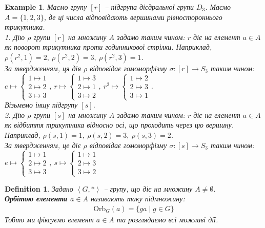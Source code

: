 \documentclass[a4paper, 10pt]{article}
\theoremstyle{theoremdd}
\theoremstyle{theoremdd}
\newtheorem{definition}[theorem]{Definition}
\theoremstyle{theoremdd}
\theoremstyle{theoremdd}
\theoremstyle{theoremdd}
\newtheorem{example}[theorem]{Example}
\theoremstyle{theoremdd}
\theoremstyle{theoremdd}
\theoremstyle{theoremdd}
\theoremstyle{theoremdd}
\theoremstyle{theoremdd}
\theoremstyle{theoremdd}
\theoremstyle{theoremdd}
\theoremstyle{theoremdd}
\theoremstyle{theoremdd}
\theoremstyle{theoremdd}
\newcommand\Orb{\text{Orb}}
\begin{document}
\begin{example}
Маємо групу $[r]$ -- підгрупа дієдральної групи $D_3$. Маємо $A = \{1,2,3\}$, де ці числа відповідають вершинами рівностороннього трикутника.\\
1. Дію $\rho$ групи $[r]$ на множину $A$ задамо таким чином: $r$ діє на елемент $a \in A$ як поворот трикутника проти годинникової стрілки. Наприклад, $\rho(r^2,1) = 2,\ \rho(r^2,2) = 3,\ \rho(r^2,3) = 1$.\\
За твердженням, ця дія $\rho$ відповідає гомоморфізму $\sigma \colon [r] \to S_3$ таким чином:\\
$e \mapsto \begin{cases} 1 \mapsto 1 \\ 2 \mapsto 2 \\ 3 \mapsto 3 \end{cases},\ r \mapsto \begin{cases} 1 \mapsto 3 \\ 2 \mapsto 1 \\ 3 \mapsto 2 \end{cases},\ r^2 \mapsto \begin{cases} 1 \mapsto 2 \\ 2 \mapsto 3 \\ 3 \mapsto 1 \end{cases}$.
\bigskip \\
Візьмемо іншу підгрупу $[s]$.\\
2. Дію $\rho$ групи $[s]$ на множину $A$ задамо таким чином: $r$ діє на елемент $a \in A$ як відбиття трикутника відносно осі, що проходить через цю вершину. Наприклад, $\rho(s,1) = 1,\ \rho(s,2) = 3,\ \rho(s,3) = 2$.\\
За твердженням, це діє $\rho$ відповідає гомоморфізму $\sigma \colon [s] \to S_3$ таким чином:\\
$e \mapsto \begin{cases} 1 \mapsto 1 \\ 2 \mapsto 2 \\ 3 \mapsto 3 \end{cases},\ s \mapsto \begin{cases} 1 \mapsto 1 \\ 2 \mapsto 3 \\ 3 \mapsto 2 \end{cases}$
\end{example}

\begin{definition}
Задано $\left< G,*\right>$ -- групу, що діє на множину $A \neq \emptyset$.\\
\textbf{Орбітою елемента $a \in A$} називають таку підмножину:
\begin{align*}
\Orb_G(a) = \{ga \mid g \in G\}
\end{align*}
Тобто ми фіксуємо елемент $a \in A$ та розглядаємо всі можливі дії.
\end{definition}
\end{document}
